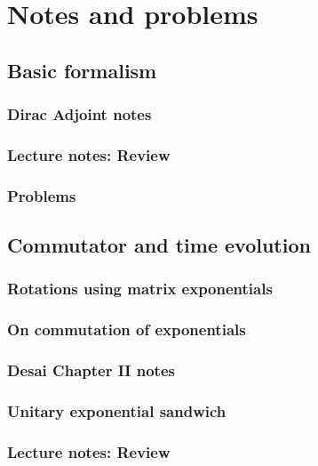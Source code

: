 \part{Notes and problems}
   \chapter{Basic formalism}
      \section{Dirac Adjoint notes}
         
      \section{Lecture notes: Review}
         
   \section{Problems}
      
      

   \chapter{Commutator and time evolution}
      \section{Rotations using matrix exponentials}
         
      \section{On commutation of exponentials}
         
      \section{Desai Chapter II notes}
         
      \section{Unitary exponential sandwich}
         
      \section{Lecture notes: Review}
         
